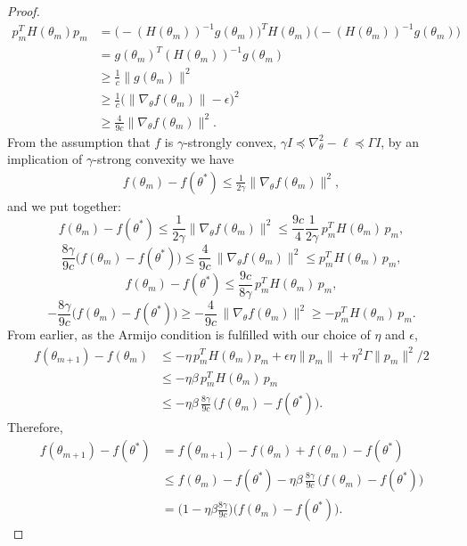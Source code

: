 \begin{proof}
\begin{align}
    p_m^TH(\theta_m)p_m &= \big(-(H(\theta_m))^{-1}g(\theta_m)\big)^TH(\theta_m)\big(-(H(\theta_m))^{-1}g(\theta_m)\big) \\
    &= g(\theta_m)^T(H(\theta_m))^{-1}g(\theta_m) \\
    &\geq \frac{1}{c}\|g(\theta_m)\|^2 \\
    &\geq \frac{1}{c}\big(\|\nabla_\theta f(\theta_m)\| - \epsilon\big)^2 \\
    &\geq \frac{4}{9c}\|\nabla_\theta f(\theta_m)\|^2.
\end{align}
From the assumption that $f$ is $\gamma$-strongly convex, $\gamma I \preceq \nabla_\theta^2 -\ell \preceq \Gamma I$, by an implication of $\gamma$-strong convexity we have
\begin{align}
    f(\theta_m) - f(\theta^*) \leq \frac{1}{2\gamma}\big\|\nabla_\theta f(\theta_m)\big\|^2,
\end{align}
and we put together:
\begin{equation}
    f(\theta_m) - f(\theta^*) \leq \frac{1}{2\gamma}\big\|\nabla_\theta f(\theta_m)\big\|^2 \leq \frac{9c}{4}\frac{1}{2\gamma}\, p_m^TH(\theta_m)\, p_m,
\end{equation}
\begin{equation}
    \frac{8\gamma}{9c}\big(f(\theta_m) - f(\theta^*)\big) \leq \frac{4}{9c}\, \big\|\nabla_\theta f(\theta_m)\big\|^2 \leq p_m^TH(\theta_m)\, p_m,
\end{equation}
\begin{equation}
    f(\theta_m) - f(\theta^*) \leq \frac{9c}{8\gamma}\, p_m^TH(\theta_m)\, p_m,
\end{equation}
\begin{equation}
    -\frac{8\gamma}{9c}\big(f(\theta_m) - f(\theta^*)\big) \geq -\frac{4}{9c}\, \big\|\nabla_\theta f(\theta_m)\big\|^2 \geq -p_m^TH(\theta_m)\, p_m.
\end{equation}
From earlier, as the Armijo condition is fulfilled with our choice of $\eta$ and $\epsilon$,
\begin{align}
    f(\theta_{m+1})-f(\theta_m) &\leq -\eta \, p_m^TH(\theta_m)p_m + \epsilon\eta\|p_m\| + \eta^2 \Gamma \|p_m\|^2 / 2 \\
    &\leq -\eta\beta \,  p_m^TH(\theta_m)\, p_m \\
    &\leq -\eta\beta \, \frac{8\gamma}{9c}\, \big(f(\theta_m) - f(\theta^*)\big).
\end{align}
Therefore,
\begin{align}
    f(\theta_{m+1}) - f(\theta^*) 
    &= f(\theta_{m+1})-f(\theta_m)+f(\theta_m)- f(\theta^*) \\
    &\leq f(\theta_m)- f(\theta^*) -\eta\beta\, \frac{8\gamma}{9c} \, \big(f(\theta_m) - f(\theta^*)\big) \\
    &= \Big(1-\eta\beta\frac{8\gamma}{9c}\Big)\big(f(\theta_m) - f(\theta^*)\big).
\end{align}

\end{proof}
